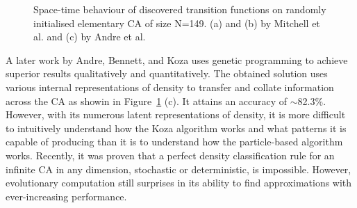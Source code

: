 \begin{figure}[!h]
\centering
            \hfill
            \hfill
            \hfill
            \caption{Space-time behaviour of discovered transition functions on randomly initialised elementary CA of size N=149. (a) and (b) by Mitchell et al.\cite{mitchell1996evolving} and (c) by Andre et al.\cite{andre1996discovery}}
\label{fig:1d-transitions}
\end{figure}

A later work by Andre, Bennett, and Koza\cite{andre1996discovery} uses genetic programming to achieve superior results qualitatively and quantitatively. The obtained solution uses various internal representations of density to transfer and collate information across the CA as showin in Figure~\ref{fig:1d-transitions} (c). It attains an accuracy of $\sim$82.3\%. However, with its numerous latent representations of density, it is more difficult to intuitively understand how the Koza algorithm works and what patterns it is capable of producing than it is to understand how the particle-based algorithm works. Recently, it was proven that a perfect density classification rule for an infinite CA in any dimension, stochastic or deterministic, is impossible\cite{buvsic2012density}. However, evolutionary computation still surprises in its ability to find approximations with ever-increasing performance. 

